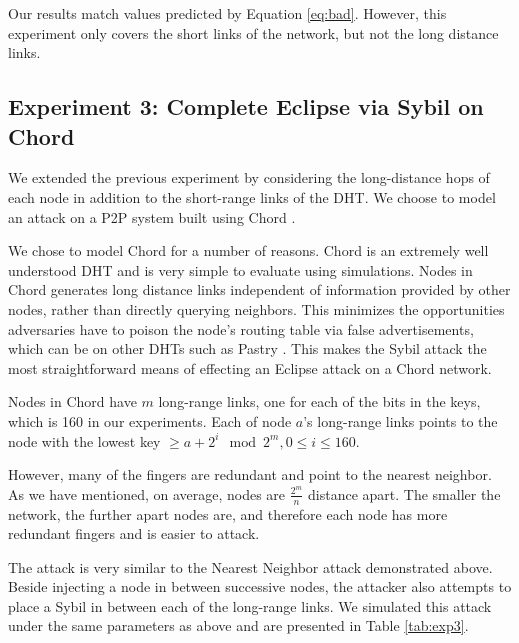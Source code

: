 \documentclass[11pt,conference]{IEEEtran}
\begin{document}
Our results match values predicted by Equation \ref{eq:bad}.
However, this experiment only covers the short links of the network, but not the long distance links.




\subsection{Experiment 3: Complete Eclipse via Sybil on Chord}
\label{sec:chord}
We extended the previous experiment by considering the long-distance hops of each node in addition to the short-range links of the DHT.
We choose to model an attack on a P2P system built using Chord \cite{chord}.


We chose to model Chord for a number of reasons.
Chord is an extremely well understood DHT and is very simple to evaluate using simulations.
Nodes in Chord generates long distance links independent of information provided by other nodes, rather than directly querying neighbors.
This minimizes the opportunities adversaries have to poison the node's routing table via false advertisements, which can be on other DHTs such as Pastry \cite{pastry}. 
This makes the Sybil attack the most straightforward means of effecting an Eclipse attack on a Chord network.

Nodes in Chord have $m$ long-range links, one for each of the bits in the keys, which is 160 in our experiments.
Each of node $a$'s long-range links points to the node with the lowest key $\geq a + 2^{i} \mod 2^{m}, 0 \leq i \leq 160$.

However, many of the fingers are redundant and point to the nearest neighbor.
As we have mentioned, on average, nodes are $\frac{2^{m}}{n}$ distance apart.
The smaller the network, the further apart nodes are, and therefore each  node has more redundant fingers and is easier to attack.

The attack is very similar to the Nearest Neighbor attack demonstrated above.
Beside injecting a node in between successive nodes, the attacker also attempts to place a Sybil in between each of the long-range links.
We simulated this attack under the same parameters as above and are presented in Table \ref{tab:exp3}.
\end{document}
